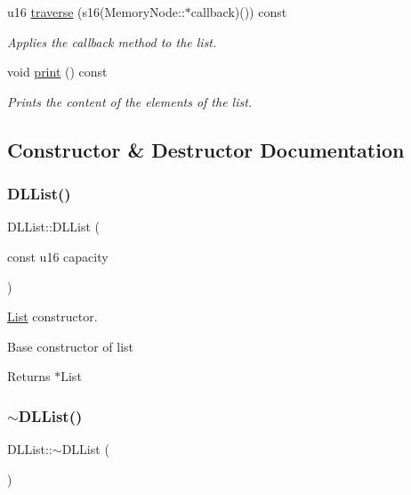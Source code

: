 \begin{DoxyCompactItemize}
u16 \hyperlink{class_d_l_list_aee1a76258cd2af0af35ff68541810f46}{traverse} (s16(Memory\+Node\+::$\ast$callback)()) const
\begin{DoxyCompactList}\small\item\em Applies the callback method to the list. \end{DoxyCompactList}\item 
void \hyperlink{class_d_l_list_aea04194eeedf39bc0682cf459f39f26b}{print} () const
\begin{DoxyCompactList}\small\item\em Prints the content of the elements of the list. \end{DoxyCompactList}\end{DoxyCompactItemize}


\subsection{Constructor \& Destructor Documentation}
\mbox{\label{class_d_l_list_ad67c39ec267f25ad501978f8e9557e91}} 
\subsubsection{\texorpdfstring{D\+L\+List()}{DLList()}}
{\footnotesize\ttfamily D\+L\+List\+::\+D\+L\+List (\begin{DoxyParamCaption}\item[{const u16}]{capacity }\end{DoxyParamCaption})}



\hyperlink{class_list}{List} constructor. 

Base constructor of list

\begin{DoxyReturn}{Returns}
$\ast$\+List 
\end{DoxyReturn}
\mbox{\label{class_d_l_list_af41d427d0901f856b267856007eb0eac}} 
\subsubsection{\texorpdfstring{$\sim$\+D\+L\+List()}{~DLList()}}
{\footnotesize\ttfamily D\+L\+List\+::$\sim$\+D\+L\+List (\begin{DoxyParamCaption}{ }\end{DoxyParamCaption})}



